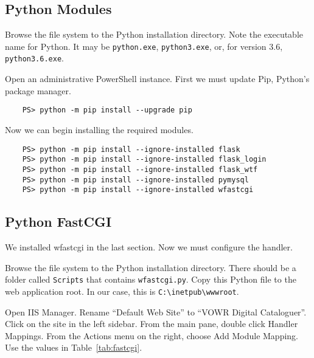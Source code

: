 \documentclass{book}
\renewcommand{\,}{\kern0.2ex}
\begin{document}
	\subsection{Python Modules}
	Browse the file system to the Python installation directory. Note the executable name for Python. It may be \verb|python.exe|, \verb|python3.exe|, or, for version 3.6, \verb|python3.6.exe|.
	
	Open an administrative PowerShell instance. First we must update Pip, Python's package manager.
	
	\begin{verbatim}
	PS> python -m pip install --upgrade pip
	\end{verbatim}
	
	Now we can begin installing the required modules.
	
	\begin{verbatim}
	PS> python -m pip install --ignore-installed flask
	PS> python -m pip install --ignore-installed flask_login
	PS> python -m pip install --ignore-installed flask_wtf
	PS> python -m pip install --ignore-installed pymysql
	PS> python -m pip install --ignore-installed wfastcgi
	\end{verbatim}
	
	\subsection{Python FastCGI}
	We installed {\sffamily wfastcgi} in the last section. Now we must configure the handler.

	Browse the file system to the Python installation directory. There should be a folder called \verb|Scripts| that contains \verb|wfastcgi.py|. Copy this Python file to the web application root. In our case, this is \verb|C:\inetpub\wwwroot|.
	
	Open IIS Manager. Rename ``Default Web Site'' to ``VOWR Digital Cataloguer''. Click on the site in the left sidebar. From the main pane, double click Handler Mappings. From the Actions menu on the right, choose Add Module Mapping. Use the values in Table~\ref{tab:fastcgi}.

	\begin{table}[ht!]
		\centering
		\caption{\label{tab:fastcgi}}
	\end{table}
	
\end{document}
